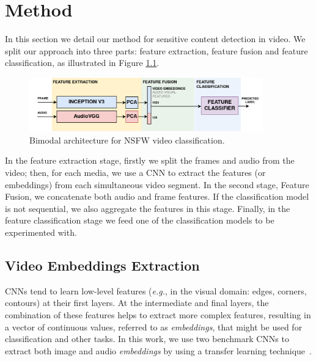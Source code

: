 \newpage

\chapter{Method}
\label{chap:method}
In this section we detail our method for sensitive content detection in video. We split our approach into three parts: feature extraction, feature fusion and feature classification, as illustrated in Figure \ref{fig:model}.
\begin{figure}[!ht]
    \centering
    \includegraphics[width=0.9\textwidth]{img/model-2.png}
    \caption{Bimodal architecture for NSFW video classification.}
    \label{fig:model}
    \vspace{-1em}
\end{figure}

In the feature extraction stage, firstly we split the frames and audio from the video; then, for each media, we use a CNN to extract the features (or embeddings) from each simultaneous video segment. In the second stage, Feature Fusion, we concatenate both audio and frame features. If the classification model is not sequential, we also aggregate the features in this stage. Finally, in the feature classification stage we feed one of the classification models to be experimented with.

\section{Video Embeddings Extraction}
\label{sec:video_features}

CNNs tend to learn low-level features (\textit{e.g.}, in the visual domain: edges, corners, contours) at their first layers. At the intermediate and final layers, the combination of these features helps to extract more complex features, resulting in a vector of continuous values, referred to as \textit{embeddings}, that might be used for classification and other tasks. In this work, we use two benchmark CNNs to extract both image and audio \textit{embeddings} by using a transfer learning technique~\cite{tan2018survey}.



